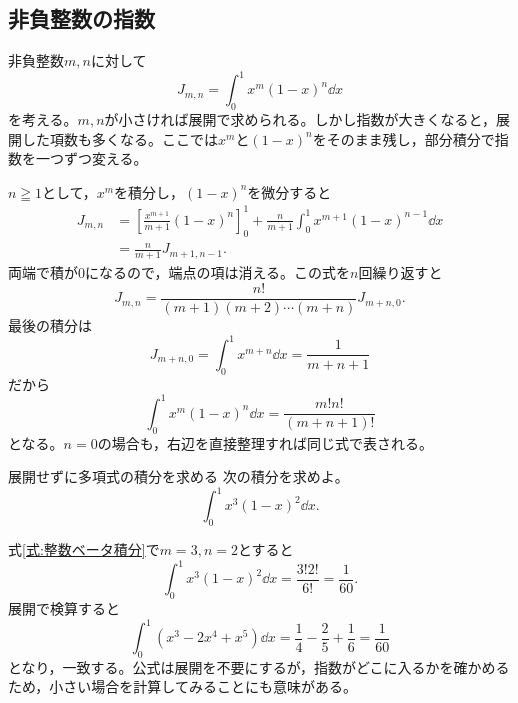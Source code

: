 \subsection{非負整数の指数}

非負整数$m,n$に対して
\[
 J_{m,n}=\int_0^1x^m(1-x)^n\dd x
\]
を考える。$m,n$が小さければ展開で求められる。しかし指数が大きくなると，展開した項数も多くなる。ここでは$x^m$と$(1-x)^n$をそのまま残し，部分積分で指数を一つずつ変える。

$n\geqq1$として，$x^m$を積分し，$(1-x)^n$を微分すると
\begin{align*}
 J_{m,n}
 &=\left[\frac{x^{m+1}}{m+1}(1-x)^n\right]_0^1
   +\frac{n}{m+1}\int_0^1x^{m+1}(1-x)^{n-1}\dd x\\
 &=\frac{n}{m+1}J_{m+1,n-1}.
\end{align*}
両端で積が$0$になるので，端点の項は消える。この式を$n$回繰り返すと
\[
 J_{m,n}
 =\frac{n!}{(m+1)(m+2)\cdots(m+n)}J_{m+n,0}.
\]
最後の積分は
\[
 J_{m+n,0}=\int_0^1x^{m+n}\dd x=\frac1{m+n+1}
\]
だから
\begin{equation}\label{式:整数ベータ積分}
 \boxed{\displaystyle
 \int_0^1x^m(1-x)^n\dd x=\frac{m!n!}{(m+n+1)!}}
\end{equation}
となる。$n=0$の場合も，右辺を直接整理すれば同じ式で表される。

\begin{example}{展開せずに多項式の積分を求める}
次の積分を求めよ。
\[
 \int_0^1x^3(1-x)^2\dd x.
\]
\end{example}

式\eqref{式:整数ベータ積分}で$m=3,n=2$とすると
\[
 \int_0^1x^3(1-x)^2\dd x
 =\frac{3!2!}{6!}=\frac1{60}.
\]
展開で検算すると
\[
 \int_0^1(x^3-2x^4+x^5)\dd x
 =\frac14-\frac25+\frac16=\frac1{60}
\]
となり，一致する。公式は展開を不要にするが，指数がどこに入るかを確かめるため，小さい場合を計算してみることにも意味がある。

